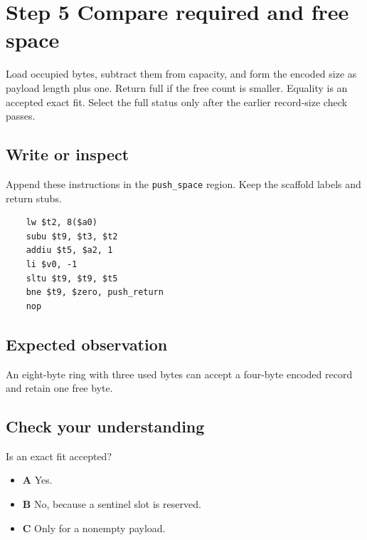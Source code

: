 \section{Step 5 Compare required and free space}\label{ring-s05}

Load occupied bytes, subtract them from capacity, and form the encoded size as payload length plus one. Return full if the free count is smaller. Equality is an accepted exact fit. Select the full status only after the earlier record-size check passes.

\subsection{Write or inspect}
Append these instructions in the \texttt{push\_space} region. Keep the scaffold labels and return stubs.

\begin{verbatim}
    lw $t2, 8($a0)
    subu $t9, $t3, $t2
    addiu $t5, $a2, 1
    li $v0, -1
    sltu $t9, $t9, $t5
    bne $t9, $zero, push_return
    nop
\end{verbatim}

\subsection{Expected observation}
An eight-byte ring with three used bytes can accept a four-byte encoded record and retain one free byte.

\subsection{Check your understanding}
Is an exact fit accepted?

\begin{itemize}
  \item \textbf{A} Yes.
  \item \textbf{B} No, because a sentinel slot is reserved.
  \item \textbf{C} Only for a nonempty payload.
\end{itemize}

